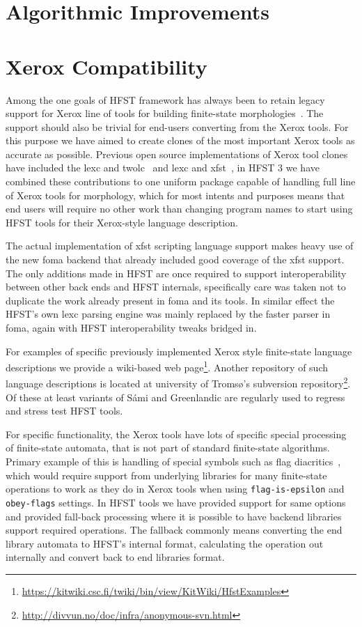 \documentclass{llncs}
\begin{document}
\section{Algorithmic Improvements}

\section{Xerox Compatibility}

Among the one goals of HFST framework has always been to retain legacy support
for Xerox line of tools for building finite-state
morphologies~\cite{beesley/2003}. The support should also be trivial for
end-users converting from the Xerox tools. For this purpose we have aimed to
create clones of the most important Xerox tools as accurate as possible.
Previous open source implementations of Xerox tool clones have included the
lexc and twolc~\cite{linden/2009/sfcm} and lexc and xfst~\cite{hulden/2009}, in
HFST 3 we have combined these contributions to one uniform package capable of
handling full line of Xerox tools for morphology, which for most intents and
purposes means that end users will require no other work than changing program
names to start using HFST tools for their Xerox-style language description.


The actual implementation of xfst scripting language support makes heavy
use of the new foma backend that already included good coverage of the
xfst support. The only additions made in HFST are once required to support
interoperability between other back ends and HFST internals, specifically
care was taken not to duplicate the work already present in foma and its
tools. In similar effect the HFST's own lexc parsing engine was mainly
replaced by the faster parser in foma, again with HFST interoperability
tweaks bridged in.

For examples of specific previously implemented Xerox style finite-state
language descriptions we provide a wiki-based web page\footnote{\url{https://kitwiki.csc.fi/twiki/bin/view/KitWiki/HfstExamples}}. Another repository of
such language descriptions is located at university of Tromsø's subversion
repository\footnote{\url{http://divvun.no/doc/infra/anonymous-svn.html}}.
Of these at least variants of Sámi and Greenlandic are regularly
used to regress and stress test HFST tools.

For specific functionality, the Xerox tools have lots of specific special
processing of finite-state automata, that is not part of standard finite-state
algorithms. Primary example of this is handling of special symbols such as
flag diacritics~\cite{beesley/1998}, which would require support from underlying
libraries for many finite-state operations to work as they do in Xerox tools
when using \texttt{flag-is-epsilon} and \texttt{obey-flags} settings. In
HFST tools we have provided support for same options and provided fall-back
processing where it is possible to have backend libraries support required
operations. The fallback commonly means converting the end library
automata to HFST's internal format, calculating the operation out internally
and convert back to end libraries format. 
\end{document}

